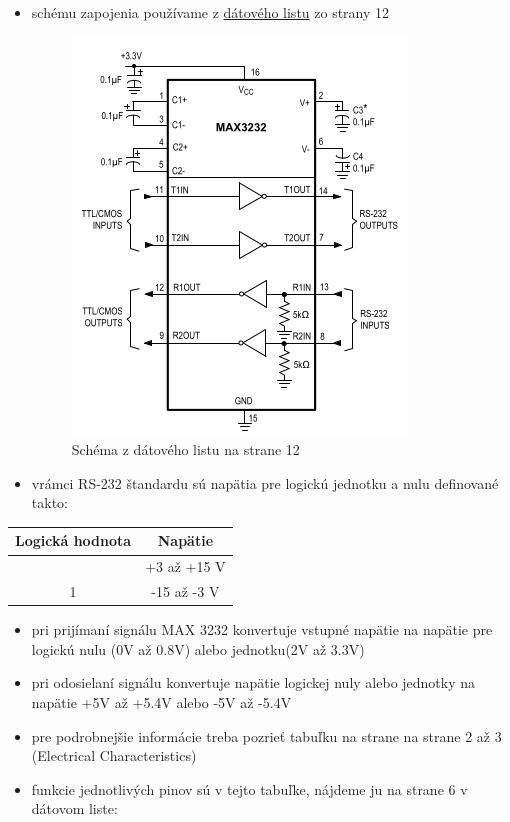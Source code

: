 \begin{itemize}
  \begin{itemize}
  \item
    schému zapojenia používame z \href{https://github.com/ostertag/UACS/blob/hardwear_kozuch/rs-232_interface/Data_sheet.pdf}{dátového listu}
    zo strany 12
    \begin{figure}[!h]
        \centering
        \includegraphics[width=0.5\linewidth]{org_sch.png}
        \caption{Schéma z dátového listu na strane 12}
        \label{fig:enter-label}
    \end{figure}
  \item
    vrámci RS-232 štandardu sú napätia pre logickú jednotku a nulu
    definované takto:
  \end{itemize}

  \begin{longtable}[]{@{}cc@{}}
  \toprule\noalign{}
  Logická hodnota & Napätie \\
  \midrule\noalign{}
  \endhead
  \bottomrule\noalign{}
  \endlastfoot
  0 & +3 až +15 V \\
  1 & -15 až -3 V \\
  \end{longtable}

  \begin{itemize}
  
  \item
    pri prijímaní signálu MAX 3232 konvertuje vstupné napätie na napätie
    pre logickú nulu (0V až 0.8V) alebo jednotku(2V až 3.3V)
  \item
    pri odosielaní signálu konvertuje napätie logickej nuly alebo
    jednotky na napätie +5V až +5.4V alebo -5V až -5.4V 
  \item
    pre podrobnejšie informácie treba pozrieť tabuľku na strane na strane 2 až 3 (Electrical Characteristics)
  \item
    funkcie jednotlivých pinov sú v tejto tabuľke, nájdeme ju na strane
    6 v dátovom liste:
  \end{itemize}


\end{itemize}
